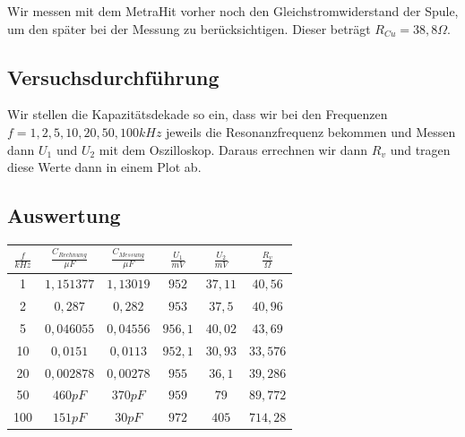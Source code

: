 \documentclass{article}
\begin{document}
Wir messen mit dem MetraHit vorher noch den Gleichstromwiderstand der Spule, um den später bei der Messung zu berücksichtigen.
Dieser beträgt $R_{Cu} = 38,8\Omega$.

\subsection{Versuchsdurchführung}

Wir stellen die Kapazitätsdekade so ein, dass wir bei den Frequenzen $f = 1,2,5,10,20,50,100kHz$ jeweils die Resonanzfrequenz bekommen und Messen dann
$U_1$ und $U_2$ mit dem Oszilloskop. Daraus errechnen wir dann $R_v$ und tragen diese Werte dann in einem Plot ab.

\subsection{Auswertung}
\begin{center}

  \begin{tabular}{|c|c|c|c|c|c|}
    \hline
    $\frac{f}{kHz}$ & $\frac{C_{Rechnung}}{\mu F}$ & $\frac{C_{Messung}}{\mu F}$ & $\frac{U_1}{mV}$ & $\frac{U_2}{mV}$ & $\frac{R_v}{\Omega}$ \\
    \hline
    1               & $1,151377$                   & $1,13019$                   & $952$            & $37,11$          & $40,56$              \\
    \hline
    2               & $0,287$                      & $0,282$                     & $953$            & $37,5$           & $40,96$              \\
    \hline
    5               & $0,046055$                   & $0,04556$                   & $956,1$          & $40,02$          & $43,69$              \\
    \hline
    10              & $0,0151$                     & $0,0113$                    & $952,1$          & $30,93$          & $33,576$             \\
    \hline
    20              & $0,002878$                   & $0,00278$                   & $955$            & $36,1$           & $39,286$             \\
    \hline
    50              & $460pF$                      & $370pF$                     & $959$            & $79$             & $89,772$             \\
    \hline
    100             & $151pF$                      & $30pF$                      & $972$            & $405$            & $714,28$             \\
    \hline
  \end{tabular}
\end{center}
\end{document}
